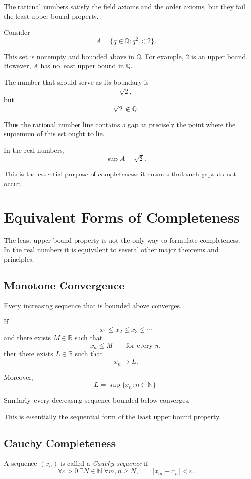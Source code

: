 \documentclass{essay}
\begin{document}
The rational numbers satisfy the field axioms and the order axioms, but they fail the least upper bound property.

Consider
\[
A=\{q\in\mathbb{Q}:q^2<2\}.
\]

This set is nonempty and bounded above in \(\mathbb{Q}\). For example, \(2\) is an upper bound. However, \(A\) has no least upper bound in \(\mathbb{Q}\).

The number that should serve as its boundary is
\[
\sqrt{2},
\]
but
\[
\sqrt{2}\notin\mathbb{Q}.
\]

Thus the rational number line contains a gap at precisely the point where the supremum of this set ought to lie.

In the real numbers,
\[
\sup A=\sqrt{2}.
\]

This is the essential purpose of completeness: it ensures that such gaps do not occur.

\section{Equivalent Forms of Completeness}

The least upper bound property is not the only way to formulate completeness. In the real numbers it is equivalent to several other major theorems and principles.

\subsection{Monotone Convergence}

Every increasing sequence that is bounded above converges.

If
\[
x_1\leq x_2\leq x_3\leq\cdots
\]
and there exists \(M\in\mathbb{R}\) such that
\[
x_n\leq M
\qquad
\text{for every } n,
\]
then there exists \(L\in\mathbb{R}\) such that
\[
x_n\to L.
\]

Moreover,
\[
L=\sup\{x_n:n\in\mathbb{N}\}.
\]

Similarly, every decreasing sequence bounded below converges.

This is essentially the sequential form of the least upper bound property.

\subsection{Cauchy Completeness}

A sequence \((x_n)\) is called a \emph{Cauchy sequence} if
\[
\forall\varepsilon>0\;\exists N\in\mathbb{N}\;
\forall m,n\geq N,
\qquad
|x_m-x_n|<\varepsilon.
\]
\end{document}
